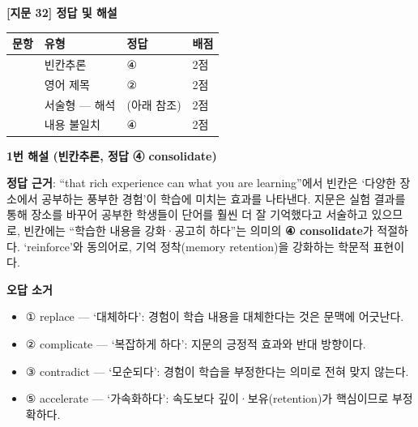 \documentclass[11pt,a4paper]{article}
\begin{document}
\begin{center}
{\fontsize{15}{17}\selectfont\sffamily\bfseries [지문 32] 정답 및 해설}
\end{center}
\vspace{6pt}

\begin{center}
\begin{tabular}{>{\centering\arraybackslash}p{18mm}
                >{\centering\arraybackslash}p{28mm}
                >{\centering\arraybackslash}p{18mm}
                >{\centering\arraybackslash}p{18mm}}
\toprule
문항 & 유형 & 정답 & 배점 \\
\midrule
1 & 빈칸추론 & ④ & 2점 \\
2 & 영어 제목 & ② & 2점 \\
3 & 서술형 — 해석 & (아래 참조) & 2점 \\
4 & 내용 불일치 & ④ & 2점 \\
\bottomrule
\end{tabular}
\end{center}

\bigskip

{\sffamily\bfseries 1번 해설 (빈칸추론, 정답 ④ consolidate)}

\medskip
\begin{pbox}
\textbf{정답 근거}: ``that rich experience can \underline{\hspace{2cm}} what you are learning''에서
빈칸은 `다양한 장소에서 공부하는 풍부한 경험'이 학습에 미치는 효과를 나타낸다.
지문은 실험 결과를 통해 장소를 바꾸어 공부한 학생들이 단어를 훨씬 더 잘 기억했다고 서술하고
있으므로, 빈칸에는 ``학습한 내용을 강화·공고히 하다''는 의미의 \textbf{④ consolidate}가 적절하다.
`reinforce'와 동의어로, 기억 정착(memory retention)을 강화하는 학문적 표현이다.
\end{pbox}

\medskip
\textbf{오답 소거}
\begin{itemize}[leftmargin=2em,itemsep=1pt]
  \item ① replace — `대체하다': 경험이 학습 내용을 대체한다는 것은 문맥에 어긋난다.
  \item ② complicate — `복잡하게 하다': 지문의 긍정적 효과와 반대 방향이다.
  \item ③ contradict — `모순되다': 경험이 학습을 부정한다는 의미로 전혀 맞지 않는다.
  \item ⑤ accelerate — `가속화하다': 속도보다 깊이·보유(retention)가 핵심이므로 부정확하다.
\end{itemize}
\end{document}
